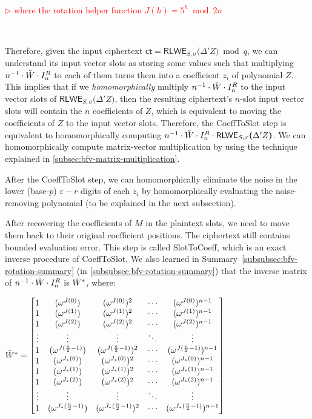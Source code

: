 $ $

\textcolor{red}{ $\rhd$ where the rotation helper function $J(h) = 5^h \bmod 2n$}

$ $

Therefore, given the input ciphertext $\textsf{ct} = \textsf{RLWE}_{S, \sigma}\bm(\Delta' Z\bm) \bmod q$, we can understand its input vector slots as storing some values such that multiplying $n^{-1}\cdot\tilde{W} \cdot I_n^R$ to each of them turns them into a coefficient $z_i$ of polynomial $Z$. This implies that if we \textit{homomorphically} multiply $n^{-1}\cdot\tilde{W} \cdot I_n^R$ to the input vector slots of $\textsf{RLWE}_{S, \sigma}\bm(\Delta' Z\bm)$, then the resulting ciphertext's $n$-slot input vector slots will contain the $n$ coefficients of $Z$, which is equivalent to moving the coefficients of $Z$ to the input vector slots. Therefore, the \textsf{CoeffToSlot} step is equivalent to homomorphically computing $n^{-1}\cdot\tilde{W} \cdot I_n^R \cdot \textsf{RLWE}_{S, \sigma}\bm(\Delta' Z\bm)$. We can homomorphically compute matrix-vector multiplication by using the technique explained in \autoref{subsec:bfv-matrix-multiplication}.

After the \textsf{CoeffToSlot} step, we can homomorphically eliminate the noise in the lower (base-$p$) $\varepsilon-r$ digits of each $z_i$ by homomorphically evaluating the noise-removing polynomial (to be explained in the next subsection).

After recovering the coefficients of $M$ in the plaintext slots, we need to move them back to their original coefficient positions. The ciphertext still contains bounded evaluation error. This step is called \textsf{SlotToCoeff}, which is an exact inverse procedure of \textsf{CoeffToSlot}. We also learned in Summary~\ref*{subsubsec:bfv-rotation-summary} (in \autoref{subsubsec:bfv-rotation-summary}) that the inverse matrix of $n^{-1}\cdot\tilde{W} \cdot I_n^R$ is $\tilde{W}^*$, where:

$\tilde{W}^* = \begin{bmatrix}
1 & (\omega^{J(0)}) & (\omega^{J(0)})^2 & \cdots & (\omega^{J(0)})^{n-1}\\
1 & (\omega^{J(1)}) & (\omega^{J(1)})^2 & \cdots & (\omega^{J(1)})^{n-1}\\
1 & (\omega^{J(2)}) & (\omega^{J(2)})^2 & \cdots & (\omega^{J(2)})^{n-1}\\
\vdots & \vdots & \vdots & \ddots & \vdots \\
1 & (\omega^{J(\frac{n}{2}-1)}) & (\omega^{J(\frac{n}{2}-1)})^2 & \cdots & (\omega^{J(\frac{n}{2}-1)})^{n-1}\\
1 & (\omega^{J_*(0)}) & (\omega^{J_*(0)})^2 & \cdots & (\omega^{J_*(0)})^{n-1}\\
1 & (\omega^{J_*(1)}) & (\omega^{J_*(1)})^2 & \cdots & (\omega^{J_*(1)})^{n-1}\\
1 & (\omega^{J_*(2)}) & (\omega^{J_*(2)})^2 & \cdots & (\omega^{J_*(2)})^{n-1}\\
\vdots & \vdots & \vdots & \ddots & \vdots \\
1 & (\omega^{J_*(\frac{n}{2}-1)}) & (\omega^{J_*(\frac{n}{2}-1)})^2 & \cdots & (\omega^{J_*(\frac{n}{2}-1)})^{n-1}\\
\end{bmatrix}$

